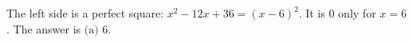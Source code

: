 The left side is a perfect square: $x^2-12x+36=(x-6)^2$. It is $0$ only for $x=6$. The answer is $\boxed{\text{(a) } 6}$.
